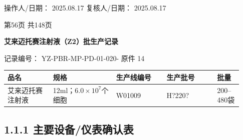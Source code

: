 \documentclass[UTF8,10pt,a4paper,fontset=fandol]{ctexart}
\newcommand{\fieldvalue}[1]{#1}
\newcommand{\handwritten}[1]{#1}
\begin{document}
\noindent
操作人/日期：
\fieldvalue{\handwritten{2025.08.17}}
\hfill
复核人/日期：
\fieldvalue{\handwritten{2025.08.17}}

\begin{center}
第56页 共148页
\end{center}

\newpage

\begin{center}
\textbf{艾来迈托赛注射液（Z2）批生产记录}
\end{center}

\noindent
记录编号：
\fieldvalue{YZ-PBR-MP-PD-01-020-}
\hfill
\fieldvalue{原件}
\hfill
\fieldvalue{14}

\begin{center}
\begin{tabular}{|p{0.18\linewidth}|p{0.25\linewidth}|p{0.20\linewidth}|p{0.20\linewidth}|p{0.10\linewidth}|}
\hline
品名 & 规格 & 生产线编号 & 生产批号 & 批量 \\
\hline
艾来迈托赛注射液 &
12ml；$6.0\times10^{7}$个细胞 &
\fieldvalue{W01009} &
\fieldvalue{\handwritten{H?220?}} &
\fieldvalue{200--480袋} \\
\hline
\end{tabular}
\end{center}

\subsection*{1.1.1 主要设备/仪表确认表}
\end{document}
